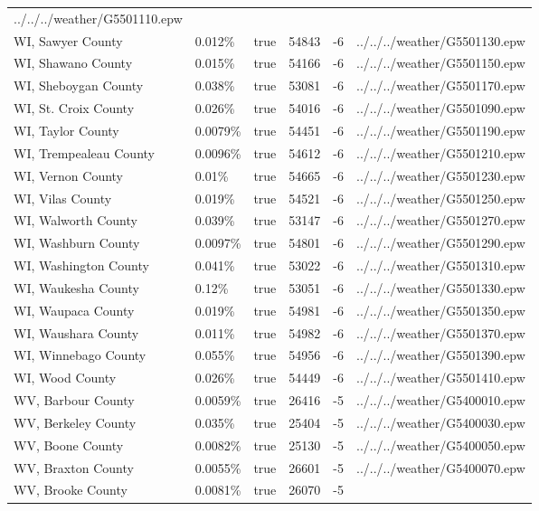 \begin{longtable}[]{@{}llllll@{}}
../../../weather/G5501110.epw \\
WI, Sawyer County & 0.012\% & true & 54843 & -6 &
../../../weather/G5501130.epw \\
WI, Shawano County & 0.015\% & true & 54166 & -6 &
../../../weather/G5501150.epw \\
WI, Sheboygan County & 0.038\% & true & 53081 & -6 &
../../../weather/G5501170.epw \\
WI, St. Croix County & 0.026\% & true & 54016 & -6 &
../../../weather/G5501090.epw \\
WI, Taylor County & 0.0079\% & true & 54451 & -6 &
../../../weather/G5501190.epw \\
WI, Trempealeau County & 0.0096\% & true & 54612 & -6 &
../../../weather/G5501210.epw \\
WI, Vernon County & 0.01\% & true & 54665 & -6 &
../../../weather/G5501230.epw \\
WI, Vilas County & 0.019\% & true & 54521 & -6 &
../../../weather/G5501250.epw \\
WI, Walworth County & 0.039\% & true & 53147 & -6 &
../../../weather/G5501270.epw \\
WI, Washburn County & 0.0097\% & true & 54801 & -6 &
../../../weather/G5501290.epw \\
WI, Washington County & 0.041\% & true & 53022 & -6 &
../../../weather/G5501310.epw \\
WI, Waukesha County & 0.12\% & true & 53051 & -6 &
../../../weather/G5501330.epw \\
WI, Waupaca County & 0.019\% & true & 54981 & -6 &
../../../weather/G5501350.epw \\
WI, Waushara County & 0.011\% & true & 54982 & -6 &
../../../weather/G5501370.epw \\
WI, Winnebago County & 0.055\% & true & 54956 & -6 &
../../../weather/G5501390.epw \\
WI, Wood County & 0.026\% & true & 54449 & -6 &
../../../weather/G5501410.epw \\
WV, Barbour County & 0.0059\% & true & 26416 & -5 &
../../../weather/G5400010.epw \\
WV, Berkeley County & 0.035\% & true & 25404 & -5 &
../../../weather/G5400030.epw \\
WV, Boone County & 0.0082\% & true & 25130 & -5 &
../../../weather/G5400050.epw \\
WV, Braxton County & 0.0055\% & true & 26601 & -5 &
../../../weather/G5400070.epw \\
WV, Brooke County & 0.0081\% & true & 26070 & -5 &

\end{longtable}
